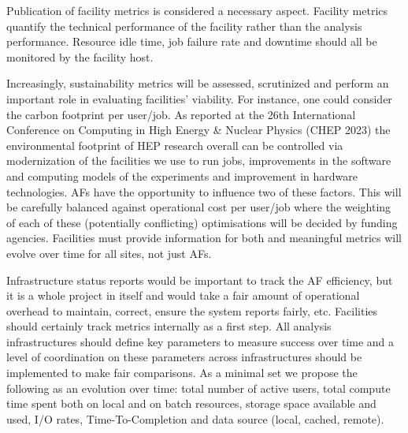 Publication of facility metrics is considered a necessary aspect. Facility metrics quantify the technical performance of the facility rather than the analysis performance. Resource idle time, job failure rate and downtime should all be monitored by the facility host.

Increasingly, sustainability metrics will be assessed, scrutinized and perform an important role in evaluating facilities’ viability. For instance, one could consider the carbon footprint per user/job. As reported at the 26th International Conference on Computing in High Energy \& Nuclear Physics (CHEP 2023) the environmental footprint of HEP research overall can be controlled via modernization of the facilities we use to run jobs, improvements in the software and computing models of the experiments and improvement in hardware technologies. AFs have the opportunity to influence two of these factors. This will be carefully balanced against operational cost per user/job where the weighting of each of these (potentially conflicting) optimisations will be decided by funding agencies. Facilities must provide information for both and meaningful metrics will evolve over time for all sites, not just AFs.

Infrastructure status reports would be important to track the AF efficiency, but it is a whole project in itself and would take a fair amount of operational overhead to maintain, correct, ensure the system reports fairly, etc. Facilities should certainly track metrics internally as a first step. All analysis infrastructures should define key parameters to measure success over time and a level of coordination on these parameters across infrastructures should be implemented to make fair comparisons. As a minimal set we propose the following as an evolution over time: total number of active users, total compute time spent both on local and on batch resources, storage space available and used, I/O rates, Time-To-Completion and data source (local, cached, remote).
